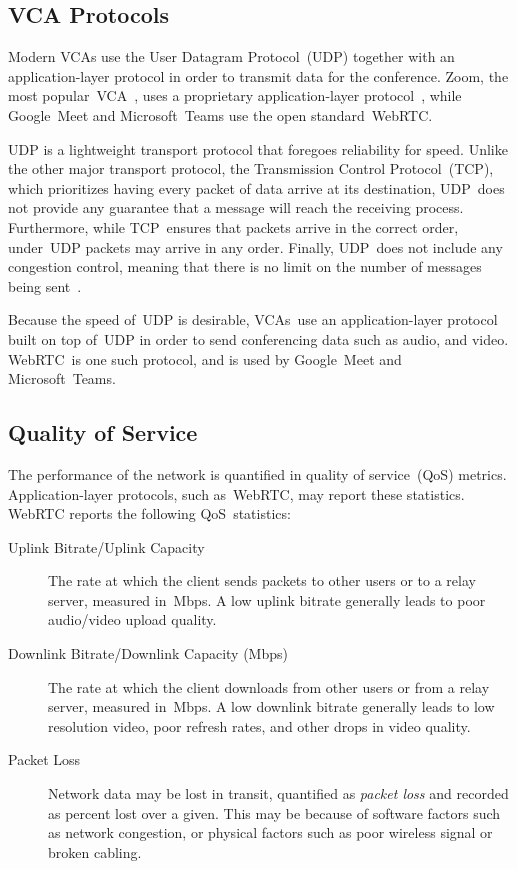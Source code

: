     \subsection{VCA Protocols}\label{introduction:qos:udp}
        Modern VCAs use the User Datagram Protocol~(UDP) together with an application-layer protocol in order to transmit data for the conference. Zoom, the most popular~VCA~\autocite{kim2021}, uses a proprietary application-layer protocol~\autocite{marczak2020}, while Google~Meet and Microsoft~Teams use the open standard~WebRTC.

        UDP is a lightweight transport protocol that foregoes reliability for speed. Unlike the other major transport protocol, the Transmission Control Protocol~(TCP), which prioritizes having every packet of data arrive at its destination, UDP~does not provide any guarantee that a message will reach the receiving process. Furthermore, while TCP~ensures that packets arrive in the correct order, under~UDP packets may arrive in any order. Finally, UDP~does not include any congestion control, meaning that there is no limit on the number of messages being sent~\autocite{alma990025667610203776}.

        Because the speed of~UDP is desirable, VCAs~use an application-layer protocol built on top of~UDP in order to send conferencing data such as audio, and video. WebRTC~is one such protocol, and is used by Google~Meet and Microsoft~Teams. %

    \subsection{Quality of Service}\label{introduction:qos}
        The performance of the network is quantified in quality of service~(QoS) metrics. Application-layer protocols, such as~WebRTC, may report these statistics. WebRTC reports the following QoS~statistics:

        \begin{description}
            \item[Uplink Bitrate/Uplink Capacity] The rate at which the client sends packets to other users or to a relay server, measured in~Mbps. A low uplink bitrate generally leads to poor audio/video upload quality.

            \item[Downlink Bitrate/Downlink Capacity (Mbps)] The rate at which the client downloads from other users or from a relay server, measured in~Mbps. A low downlink bitrate generally leads to low resolution video, poor refresh rates, and other drops in video quality.

            \item[Packet Loss] Network data may be lost in transit, quantified as \emph{packet loss} and recorded as percent lost over a given. This may be because of software factors such as network congestion, or physical factors such as poor wireless signal or broken cabling.
        \end{description}

